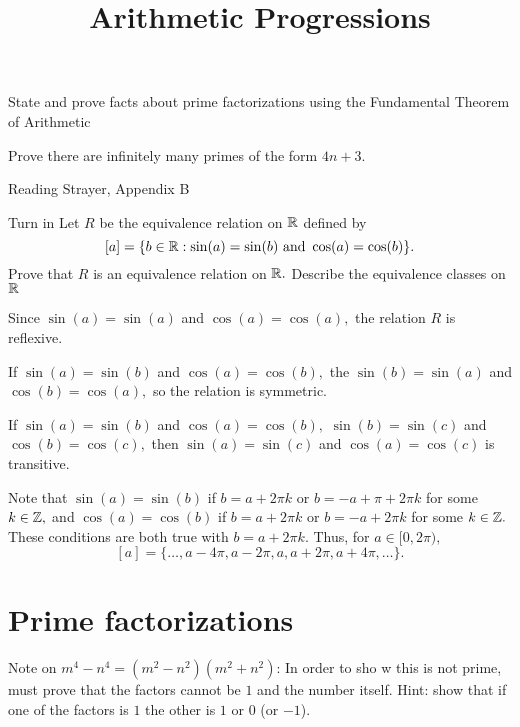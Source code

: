 \documentclass{ximera}
\title{Arithmetic Progressions}
\begin{document}
\begin{abstract}
\end{abstract}
\maketitle

\begin{obj}
    \item State and prove facts about prime factorizations using the Fundamental Theorem of Arithmetic
    \item Prove there are infinitely many primes of the form $4n+3$.
\end{obj}

\begin{pre}
    \item[Reading] Strayer, Appendix B
    \item[Turn in] Let $R$ be the equivalence relation on $\mathbb R$
    defined by
    \[
   [a]=\{b\in\mathbb R:\sin(a)=\sin(b) \textnormal{ and }\cos(a)=\cos(b)\}.\]
     Prove that $R$ is an equivalence relation on $\mathbb R.$
   Describe the equivalence classes on $\mathbb R$
   
   \begin{solution}
        Since $\sin(a)=\sin(a)$ and $\cos(a)=\cos(a),$ the relation $R$ is reflexive.

        If $\sin(a)=\sin(b)$ and $\cos(a)=\cos(b),$ the $\sin(b)=\sin(a)$ and $\cos(b)=\cos(a),$ so the relation is symmetric.

        If $\sin(a)=\sin(b)$ and $\cos(a)=\cos(b),$ $\sin(b)=\sin(c)$ and $\cos(b)=\cos(c),$ then $\sin(a)=\sin(c)$ and $\cos(a)=\cos(c)$ is transitive.

        Note that $\sin(a)=\sin(b)$ if $b=a+2\pi k$ or $b=-a+\pi+2\pi k$ for some $k\in\mathbb Z,$ and  $\cos(a)=\cos(b)$ if $b=a+2\pi k$ or $b=-a+2\pi k$ for some $k\in\mathbb Z.$ These conditions are both true with $b=a+2\pi k$. Thus, for $a\in[0,2\pi),$
        \[
            [a]=\{\dots,a-4\pi,a-2\pi,a,a+2\pi,a+4\pi,\dots\}.
        \]
       \end{solution}
\end{pre}


\section{Prime factorizations}
Note on $m^4-n^4=(m^2-n^2)(m^2+n^2)$: In order to sho w this is not prime, must prove that the factors cannot be $1$ and the number itself. Hint: show that if one of the factors is $1$ the other is $1$ or $0$ (or $-1$).
\end{document}
